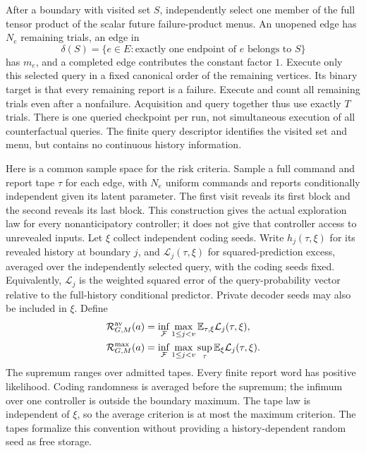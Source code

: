 After a boundary with visited set $S$, independently select one member
of the full tensor product of the scalar future failure-product menus.
An unopened edge has $N_e$ remaining trials, an edge in
\[
 \delta(S)=\{e\in E: \text{exactly one endpoint of }e\text{ belongs to }S\}
\]
has $m_e$, and a completed edge contributes the constant factor $1$.
Execute only this selected query in a fixed canonical order of the
remaining vertices. Its binary target is that every remaining report
is a failure. Execute and count all remaining trials even after a
nonfailure. Acquisition and query together thus use exactly $T$ trials.
There is one queried checkpoint per run, not simultaneous execution of
all counterfactual queries. The finite query descriptor identifies the
visited set and menu, but contains no continuous history information.

Here is a common sample space for the risk criteria. Sample a full
command and report tape $\tau$ for each edge, with $N_e$ uniform
commands and reports conditionally independent given its latent
parameter. The first visit reveals its first block and the second
reveals its last block. This construction gives the actual exploration
law for every nonanticipatory controller; it does not give that
controller access to unrevealed inputs. Let $\xi$ collect independent
coding seeds. Write $h_j(\tau,\xi)$ for its revealed history at boundary
$j$, and $\mathcal L_j(\tau,\xi)$ for squared-prediction excess,
averaged over the independently selected query, with the coding seeds
fixed. Equivalently, $\mathcal L_j$ is the weighted squared error of
the query-probability vector relative to the full-history conditional
predictor. Private decoder seeds may also be included in $\xi$.
Define
\begin{equation}\label{eq:v25-risk-definitions}
 \begin{split}
 \mathcal R^{\rm av}_{G,M}(a)
   &=\inf_{\mathcal F}\max_{1\le j<v}
                    \mathbb E_{\tau,\xi}\mathcal L_j(\tau,\xi),\\
 \mathcal R^{\rm max}_{G,M}(a)
   &=\inf_{\mathcal F}\max_{1\le j<v}
                    \sup_{\tau}\mathbb E_\xi\mathcal L_j(\tau,\xi).
 \end{split}
\end{equation}
The supremum ranges over admitted tapes. Every finite report word has
positive likelihood. Coding randomness is averaged before the
supremum; the infimum over one controller is outside the boundary
maximum. The tape law is independent of $\xi$, so the average criterion
is at most the maximum criterion. The tapes formalize this convention
without providing a history-dependent random seed as free storage.


